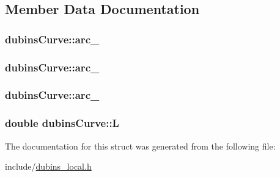 \subsection{Member Data Documentation}
\subsubsection[{\texorpdfstring{arc\+\_\+1}{arc_1}}]{ dubins\+Curve\+::arc\+\_}\hypertarget{structdubinsCurve_a0a21df61b2cb1cdd397bdc54b5aa7d7a}{}\label{structdubinsCurve_a0a21df61b2cb1cdd397bdc54b5aa7d7a}
\subsubsection[{\texorpdfstring{arc\+\_\+2}{arc_2}}]{ dubins\+Curve\+::arc\+\_}\hypertarget{structdubinsCurve_ac1cfde797f443b1a73ec3786bcc05e1e}{}\label{structdubinsCurve_ac1cfde797f443b1a73ec3786bcc05e1e}
\subsubsection[{\texorpdfstring{arc\+\_\+3}{arc_3}}]{ dubins\+Curve\+::arc\+\_}\hypertarget{structdubinsCurve_a523eb4572b6595ef9a62e7abe934bca6}{}\label{structdubinsCurve_a523eb4572b6595ef9a62e7abe934bca6}
\subsubsection[{\texorpdfstring{L}{L}}]{\setlength{\rightskip}{0pt plus 5cm}double dubins\+Curve\+::L}\hypertarget{structdubinsCurve_a4f52a92a56a4544b055cda0dbf7c4ad4}{}\label{structdubinsCurve_a4f52a92a56a4544b055cda0dbf7c4ad4}


The documentation for this struct was generated from the following file\+:\begin{DoxyCompactItemize}
\item 
include/\hyperlink{dubins__local_8h}{dubins\+\_\+local.\+h}\end{DoxyCompactItemize}

